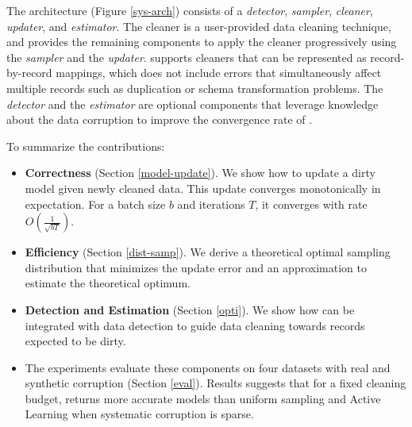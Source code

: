 

The \sys architecture (Figure \ref{sys-arch}) consists of a \emph{detector}, \emph{sampler}, \emph{cleaner}, \emph{updater}, and \emph{estimator}.
The cleaner is a user-provided data cleaning technique, and \sys provides the remaining components to apply the cleaner progressively using the \emph{sampler} and the \emph{updater}.
\sys supports cleaners that can be represented as record-by-record mappings, which does not include errors that simultaneously affect multiple records such as duplication or schema transformation problems.
The \emph{detector} and the \emph{estimator} are optional components that leverage knowledge about the data corruption to improve the convergence rate of \sys.

\noindent To summarize the contributions:
\begin{itemize}[noitemsep]
\item \textbf{Correctness} (Section \ref{model-update}). We show how to update a dirty model given newly cleaned data. This update converges monotonically in expectation. For a batch size $b$ and iterations $T$, it converges with rate $O(\frac{1}{\sqrt{bT}})$. 
\item \textbf{Efficiency} (Section \ref{dist-samp}). We derive a theoretical optimal sampling distribution that minimizes the update error and an approximation to estimate the theoretical optimum.
\item \textbf{Detection and Estimation} (Section \ref{opti}). We show how \sys can be integrated with data detection to guide data cleaning towards records expected to be dirty.
\item The experiments evaluate these components on four datasets with real and synthetic corruption (Section \ref{eval}). Results suggests that for a fixed cleaning budget, \sys returns more accurate models than uniform sampling and Active Learning when systematic corruption is sparse.

\end{itemize}






